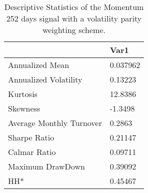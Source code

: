 \begin{table}[H]
\centering
\begin{tabular}{ll}
& Var1 \\ 
\hline 
Annualized Mean & 0.037962 \\ 
Annualized Volatility & 0.13223 \\ 
Kurtosis & 12.8386 \\ 
Skewness & -1.3498 \\ 
Average Monthly Turnover & 0.2863 \\ 
Sharpe Ratio & 0.21147 \\ 
Calmar Ratio & 0.09711 \\ 
Maximum DrawDown & 0.39092 \\ 
HH* & 0.45467 \\ 
\hline
\end{tabular}
\caption{Descriptive Statistics of the Momentum 252 days signal with a volatility parity weighting scheme.}
\label{MOM252VP}
\end{table}